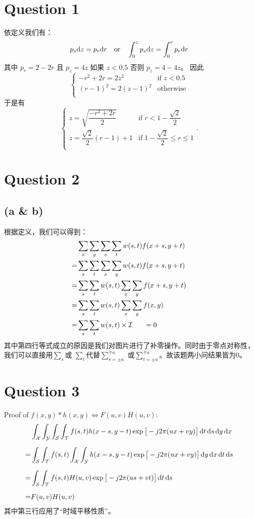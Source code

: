 \documentclass[fontset=macnew]{article}
\begin{document}
\section*{Question 1}
依定义我们有：
\[
    p_z\dd z = p_r\dd r \qor \int_0^z p_z\dd z = \int_0^r p_r\dd r
\] 其中 $p_r=2-2r$ 且 $p_z=4z$ 如果 $z<0.5$ 否则 $p_z=4-4z$。
因此
\[
    \begin{cases}
		-r^2+2r=2z^2 & \text{if }z<0.5  \\
		(r-1)^2=2(z-1)^2 & \text{otherwise} \\
    \end{cases}
\] 于是有
\[
    \begin{cases}
		z=\sqrt{\dfrac{-r^2+2r}{2}} & \text{if }r<1-\dfrac{\sqrt{2}}{2}\\[9pt]
		z=\dfrac{\sqrt{2}}{2}(r-1)+1 & \text{if }1-\dfrac{\sqrt{2}}{2}\le r\le 1 \\
    \end{cases}
.\] 

\section*{Question 2}
\subsection*{(a \& b)}
根据定义，我们可以得到：
\[
    \begin{aligned}
		&\sum_x\sum_y\sum_s\sum_t w(s,t)f(x+s,y+t)
		\\=&
		\sum_s\sum_t\sum_x\sum_y w(s,t)f(x+s,y+t)
		\\=&
		\sum_s\sum_t w(s,t) \sum_x\sum_y f(x+s,y+t)
		\\=&
		\sum_s\sum_t w(s,t) \sum_x\sum_y f(x,y)
		\\=&
		\sum_s\sum_t w(s,t)\times \mathcal{I}
		\ \ \ \ \ = 0
    \end{aligned}
\] 其中第四行等式成立的原因是我们对图片进行了补零操作。同时由于零点对称性，我们可以直接用$\sum_s$或 $\sum_t$代替$\sum_{s=\pm a}^{\mp a}$ 或$\sum_{t=\pm a}^{\mp a}$。故该题两小问结果皆为0。

\section*{Question 3}
Proof of $f(x,y)*h(x,y)\iff F(u,v)H(u,v)$:
\[
	\begin{aligned}
		&\int_{\mathcal{X}}\int_{\mathcal{Y}}\int_{\mathcal{S}}\int_{\mathcal{T}}
		f(s,t)h(x-s,y-t)\exp\big[-j2\pi(ux+vy)\big]
		\dd{t}\dd{s}\dd{y}\dd{x}
		\\[6pt]=&
		\int_{\mathcal{S}}\int_{\mathcal{T}}
		f(s,t)
		\int_{\mathcal{X}}\int_{\mathcal{Y}}
		h(x-s,y-t)\exp\big[-j2\pi(ux+vy)\big]
		\dd{y}\dd{x}\dd{t}\dd{s}
		\\[6pt]=&
		\int_{\mathcal{S}}\int_{\mathcal{T}}
		f(s,t)H(u,v)\exp\big[-j2\pi(us+vt)\big]
		\dd{t}\dd{s}
		\\[6pt]=&
		F(u,v)H(u,v)
	\end{aligned}
\] 其中第三行应用了“时域平移性质”。
\end{document}
